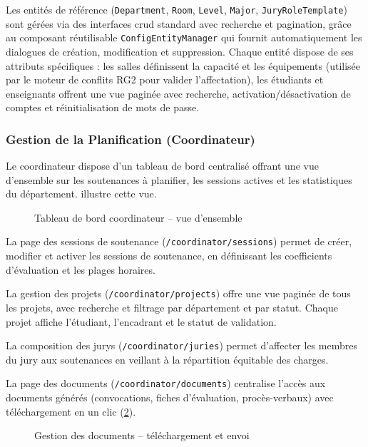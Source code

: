 Les entités de référence (\texttt{Department}, \texttt{Room}, \texttt{Level}, \texttt{Major}, \texttt{JuryRoleTemplate}) sont gérées via des interfaces \acrshort{crud} standard avec recherche et pagination, grâce au composant réutilisable \texttt{ConfigEntityManager} qui fournit automatiquement les dialogues de création, modification et suppression. Chaque entité dispose de ses attributs spécifiques : les salles définissent la capacité et les équipements (utilisée par le moteur de conflits RG2 pour valider l'affectation), les étudiants et enseignants offrent une vue paginée avec recherche, activation/désactivation de comptes et réinitialisation de mots de passe.

\subsubsection{Gestion de la Planification (Coordinateur)}
\label{ch4:features_coordinator}

Le coordinateur dispose d'un tableau de bord centralisé offrant une vue d'ensemble sur les soutenances à planifier, les sessions actives et les statistiques du département.  illustre cette vue.

\begin{figure}[H]
    \centering
    \caption{Tableau de bord coordinateur -- vue d'ensemble}
    \label{fig:coord-dashboard}
\end{figure}

La page des sessions de soutenance (\texttt{/coordinator/sessions}) permet de créer, modifier et activer les sessions de soutenance, en définissant les coefficients d'évaluation et les plages horaires.

La gestion des projets (\texttt{/coordinator/projects}) offre une vue paginée de tous les projets, avec recherche et filtrage par département et par statut. Chaque projet affiche l'étudiant, l'encadrant et le statut de validation.

La composition des jurys (\texttt{/coordinator/juries}) permet d'affecter les membres du jury aux soutenances en veillant à la répartition équitable des charges.

La page des documents (\texttt{/coordinator/documents}) centralise l'accès aux documents générés (convocations, fiches d'évaluation, procès-verbaux) avec téléchargement en un clic (\cref{fig:coord-documents}).

\begin{figure}[H]
    \centering
    \caption{Gestion des documents -- téléchargement et envoi}
    \label{fig:coord-documents}
\end{figure}

